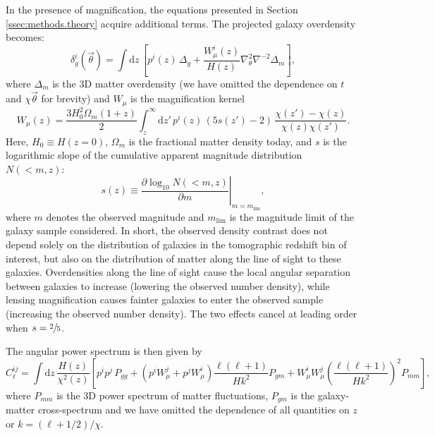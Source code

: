 \documentclass[a4paper,11pt]{article}
\newcommand{\nv}{\vec{\theta}}
\begin{document}
    In the presence of magnification, the equations presented in Section \ref{ssec:methods.theory} acquire additional terms. The projected galaxy overdensity becomes:
    \begin{equation}
      \delta^i_g(\nv)=\int \mathrm{d}z\,\left[p^i(z)\,\Delta_g+\frac{W_\mu^i(z)}{H(z)}\nabla_\theta^2\nabla^{-2}\Delta_m\right],
    \end{equation}
    where $\Delta_m$ is the 3D matter overdensity (we have omitted the dependence on $t$ and $\chi\nv$ for brevity) and $W_\mu$ is the magnification kernel
    \begin{equation}
      W_\mu(z)=\frac{3H_0^2\Omega_{m}(1+z)}{2}\int_z^\infty \mathrm{d}z'\,p^i(z)\,\left(5s(z')-2\right)\,\frac{\chi(z')-\chi(z)}{\chi(z)\chi(z')}.
    \end{equation}
    Here, $H_0\equiv H(z=0)$, $\Omega_{m}$ is the fractional matter density today, and $s$ is the logarithmic slope of the cumulative apparent magnitude distribution $N(<m, z)$:
    \begin{equation}
      \left. s(z) \equiv \frac{\partial \log_{10}N(<m, z)}{\partial m}\right \rvert_{m=m_{\mathrm{lim}}},
      \label{eq:s-func}
    \end{equation}
    where $m$ denotes the observed magnitude and $m_{\mathrm{lim}}$ is the magnitude limit of the galaxy sample considered. In short, the observed density contrast does not depend solely on the distribution of galaxies in the tomographic redshift bin of interest, but also on the distribution of matter along the line of sight to these galaxies. Overdensities along the line of sight cause the local angular separation between galaxies to increase (lowering the observed number density), while lensing magnification causes fainter galaxies to enter the observed sample (increasing the observed number density). The two effects cancel at leading order when $s=\sfrac{2}{5}$. 

    The angular power spectrum is then given by
    \begin{equation}\label{eq:cell_gg_wmag}
      C^{ij}_\ell = \int \mathrm{d}z\,\frac{H(z)}{\chi^2(z)}\left[p^ip^j\,P_{gg}+\left(p^iW_\mu^j+p^jW_\mu^i\right)\frac{\ell(\ell+1)}{Hk^2}P_{gm}+W_\mu^iW_\mu^j\left(\frac{\ell(\ell+1)}{Hk^2}\right)^2P_{mm}\right],
    \end{equation}
    where $P_{mm}$ is the 3D power spectrum of matter fluctuations, $P_{gm}$ is the galaxy-matter cross-spectrum and we have omitted the dependence of all quantities on $z$ or $k=(\ell+1/2)/\chi$.
\end{document}
